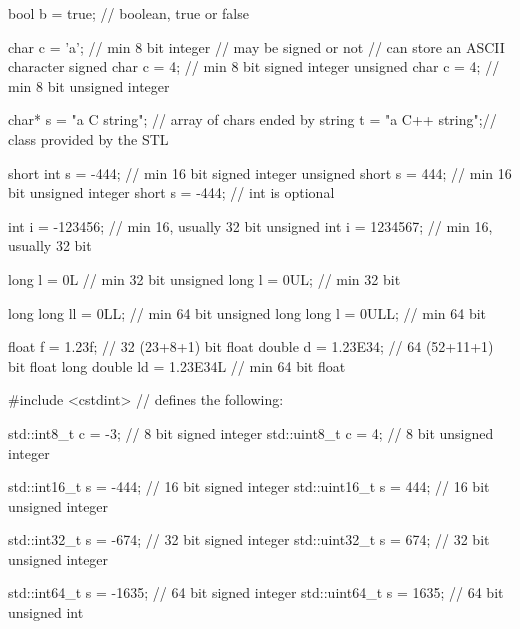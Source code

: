 \begin{frame}[fragile]
  \begin{cppcode}
    bool b = true;            // boolean, true or false

    char c = 'a';             // min 8 bit integer
                              // may be signed or not
                              // can store an ASCII character
    signed char c = 4;        // min 8 bit signed integer
    unsigned char c = 4;      // min 8 bit unsigned integer

    char* s = "a C string";   // array of chars ended by \0
    string t = "a C++ string";// class provided by the STL

    short int s = -444;       // min 16 bit signed integer
    unsigned short s = 444;   // min 16 bit unsigned integer
    short s = -444;           // int is optional
  \end{cppcode}
\end{frame}
\begin{frame}[fragile]
  \begin{cppcode}
    int i = -123456;          // min 16, usually 32 bit
    unsigned int i = 1234567; // min 16, usually 32 bit

    long l = 0L               // min 32 bit
    unsigned long l = 0UL;    // min 32 bit

    long long ll = 0LL;          // min 64 bit
    unsigned long long l = 0ULL; // min 64 bit

    float f = 1.23f;          // 32 (23+8+1) bit float
    double d = 1.23E34;       // 64 (52+11+1) bit float
    long double ld = 1.23E34L // min 64 bit float
  \end{cppcode}
\end{frame}

\begin{frame}[fragile]
  \begin{cppcode}
    #include <cstdint> // defines the following:

    std::int8_t c = -3;     // 8 bit signed integer
    std::uint8_t c = 4;     // 8 bit unsigned integer

    std::int16_t s = -444;  // 16 bit signed integer
    std::uint16_t s = 444;  // 16 bit unsigned integer

    std::int32_t s = -674;  // 32 bit signed integer
    std::uint32_t s = 674;  // 32 bit unsigned integer

    std::int64_t s = -1635; // 64 bit signed integer
    std::uint64_t s = 1635; // 64 bit unsigned int
  \end{cppcode}
\end{frame}

